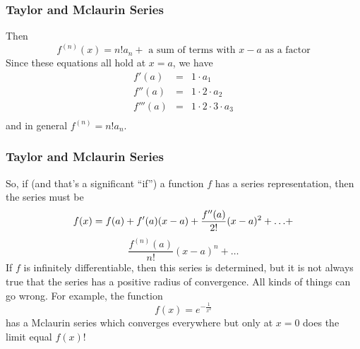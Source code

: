 \documentclass[xcolor=dvipsnames]{beamer}
\begin{document}
\begin{frame}
  \frametitle{Taylor and Mclaurin Series}
Then
  \begin{equation}
    \label{eq:itaivaeg}
    f^{(n)}(x)=n!a_{n}+\mbox{ a sum of terms with }x-a\mbox{ as a factor}
  \end{equation}
  Since these equations all hold at $x=a$, we have
  \begin{equation}
    \label{eq:ahthoazo}
    \begin{array}{rcl}
      f'(a)&=&1\cdot{}a_{1} \\
      f''(a)&=&1\cdot{}2\cdot{}a_{2} \\
      f'''(a)&=&1\cdot{}2\cdot{}3\cdot{}a_{3} \\
    \end{array}
  \end{equation}
    and in general $f^{(n)}=n!a_{n}$.
  \end{frame}

  \begin{frame}
    \frametitle{Taylor and Mclaurin Series}
    So, if (and that's a significant ``if'') a function $f$ has a
    series representation, then the series must be
    \begin{equation}
      \label{eq:ahazohve}
      f(x)=f(a)+f'(a)(x-a)+\frac{f''(a)}{2!}(x-a)^{2}+{\ldots}+\notag
    \end{equation}
    \begin{equation}
      \label{eq:oolietai}
      \frac{f^{(n)}(a)}{n!}(x-a)^{n}+{\ldots}
    \end{equation}
If $f$ is infinitely differentiable, then this series is determined,
but it is not always true that the series has a positive radius of
convergence. All kinds of things can go wrong. For example, the
function
\begin{equation}
  \label{eq:cutailae}
  f(x)=e^{-\frac{1}{x^{2}}}
\end{equation}
has a Mclaurin series which converges everywhere but only at $x=0$
does the limit equal $f(x)$!
  \end{frame}
\end{document}
